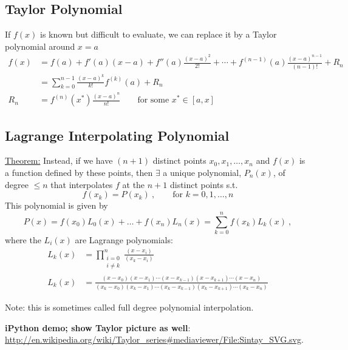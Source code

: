 \documentclass[12pt]{article}
\begin{document}
\subsection*{Taylor Polynomial}
If $f(x)$ is known but difficult to evaluate, we can replace it by a Taylor polynomial around $x = a$
\begin{align}
f(x) &= f(a) + f'(a)(x-a) + f''(a)\frac{(x-a)^2}{2!} + \cdots + f^{(n-1)}(a)\frac{(x-a)^{n-1}}{(n-1)!} + R_n \nonumber \\
%
  &= \sum_{k=0}^{n-1}\frac{(x-a)^k}{k!}f^{(k)}(a) + R_n \nonumber\\
%
R_n &= f^{(n)}(x^*)\frac{(x-a)^{n}}{n!} \qquad \text{for some } x^* \in [a, x]\nonumber
\end{align}


\subsection*{Lagrange Interpolating Polynomial}
%
\underline{Theorem:} 
Instead, if we have $(n+1)$ distinct points $x_0, x_1,\dots, x_n$ and $f(x)$ is a function defined by these points, then $\exists$ a unique polynomial, $P_n(x)$, of degree $\leq n$ that interpolates $f$ at the $n + 1$ distinct points s.t.\
\[f(x_k) = P(x_k)\:, \qquad \text{for }k= 0, 1, \dots, n\]
%
This polynomial is given by
%
\[P(x) = f(x_0)L_0(x) + \dots + f(x_n)L_n(x) = \sum_{k=0}^{n}f(x_k)L_k(x)\:,\]
%
where the $L_i(x)$ are Lagrange polynomials:
%
\begin{align}
L_k(x) &= \prod_{\substack{i=0\\ i \neq k}}^n \frac{(x-x_i)}{(x_k-x_i)}\nonumber\\
%
L_k(x) &= \frac{(x-x_0)(x-x_1)\cdots(x-x_{k-1})(x-x_{k+1})\cdots(x-x_n)}{(x_k-x_0)(x_k-x_1)\cdots(x_k-x_{k-1})(x_k-x_{k+1})\cdots(x_k-x_n)}\nonumber
\end{align}

Note: this is sometimes called full degree polynomial interpolation.

\textbf{iPython demo; show Taylor picture as well}:\\ \href{http://en.wikipedia.org/wiki/Taylor_series#mediaviewer/File:Sintay_SVG.svg}{http://en.wikipedia.org/wiki/Taylor\_series\#mediaviewer/File:Sintay\_SVG.svg}.

\clearpage
\end{document}
